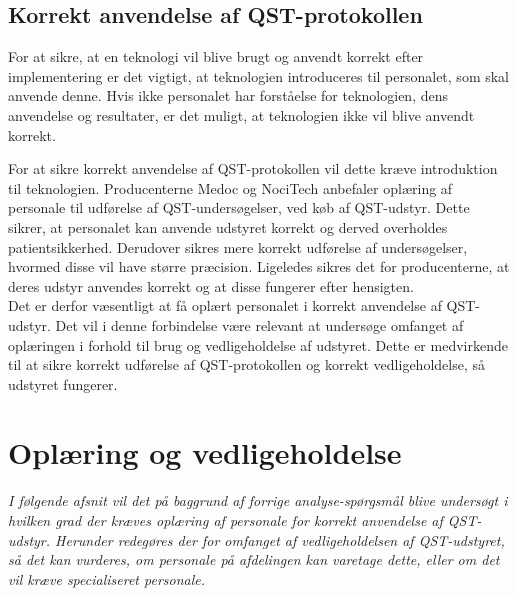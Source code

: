 \subsection{Korrekt anvendelse af QST-protokollen}
For at sikre, at en teknologi vil blive brugt og anvendt korrekt efter implementering er det vigtigt, at teknologien introduceres til personalet, som skal anvende denne. Hvis ikke personalet har forståelse for teknologien, dens anvendelse og resultater, er det muligt, at teknologien ikke vil blive anvendt korrekt. 

For at sikre korrekt anvendelse af QST-protokollen vil dette kræve introduktion til teknologien. Producenterne Medoc og NociTech anbefaler oplæring af personale til udførelse af QST-undersøgelser, ved køb af QST-udstyr. Dette sikrer, at personalet kan anvende udstyret korrekt og derved overholdes patientsikkerhed. Derudover sikres mere korrekt udførelse af undersøgelser, hvormed disse vil have større præcision. Ligeledes sikres det for producenterne, at deres udstyr anvendes korrekt og at disse fungerer efter hensigten.\\
Det er derfor væsentligt at få oplært personalet i korrekt anvendelse af QST-udstyr. Det vil i denne forbindelse være relevant at undersøge omfanget af oplæringen i forhold til brug og vedligeholdelse af udstyret. Dette er medvirkende til at sikre korrekt udførelse af QST-protokollen og korrekt vedligeholdelse, så udstyret fungerer.

\section{Oplæring og vedligeholdelse}
\textit{I følgende afsnit vil det på baggrund af forrige analyse-spørgsmål blive undersøgt i hvilken grad der kræves oplæring af personale for korrekt anvendelse af QST-udstyr. Herunder redegøres der for omfanget af vedligeholdelsen af QST-udstyret, så det kan vurderes, om personale på afdelingen kan varetage dette, eller om det vil kræve specialiseret personale.}

